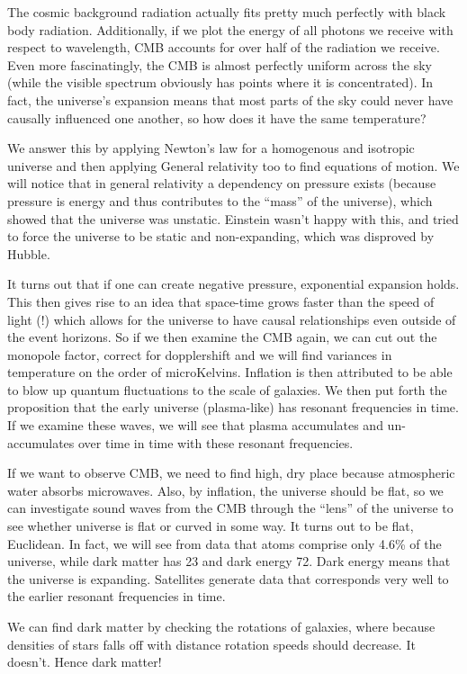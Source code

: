 \documentclass{report}
\begin{document}
The cosmic background radiation actually fits pretty much perfectly with black body radiation. Additionally, if we plot the energy of all photons we receive with respect to wavelength, CMB accounts for over half of the radiation we receive. Even more fascinatingly, the CMB is almost perfectly uniform across the sky (while the visible spectrum obviously has points where it is concentrated). In fact, the universe's expansion means that most parts of the sky could never have causally influenced one another, so how does it have the same temperature?

We answer this by applying Newton's law for a homogenous and isotropic universe and then applying General relativity too to find equations of motion. We will notice that in general relativity a dependency on pressure exists (because pressure is energy and thus contributes to the "`mass"' of the universe), which showed that the universe was unstatic. Einstein wasn't happy with this, and tried to force the universe to be static and non-expanding, which was disproved by Hubble.

It turns out that if one can create negative pressure, exponential expansion holds. This then gives rise to an idea that space-time grows faster than the speed of light (!) which allows for the universe to have causal relationships even outside of the event horizons. So if we then examine the CMB again, we can cut out the monopole factor, correct for dopplershift and we will find variances in temperature on the order of microKelvins. Inflation is then attributed to be able to blow up quantum fluctuations to the scale of galaxies. We then put forth the proposition that the early universe (plasma-like) has resonant frequencies in time. If we examine these waves, we will see that plasma accumulates and un-accumulates over time in time with these resonant frequencies.

If we want to observe CMB, we need to find high, dry place because atmospheric water absorbs microwaves. Also, by inflation, the universe should be flat, so we can investigate sound waves from the CMB through the "`lens"' of the universe to see whether universe is flat or curved in some way. It turns out to be flat, Euclidean. In fact, we will see from data that atoms comprise only 4.6\% of the universe, while dark matter has 23 and dark energy 72. Dark energy means that the universe is expanding. Satellites generate data that corresponds very well to the earlier resonant frequencies in time.

We can find dark matter by checking the rotations of galaxies, where because densities of stars falls off with distance rotation speeds should decrease. It doesn't. Hence dark matter!
\end{document}
